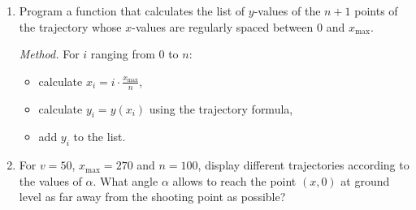\documentclass[11pt,class=report,crop=false]{standalone}
\begin{document}
\begin{activite}[Ballistics]
\begin{enumerate}
  \item Program a  function that calculates the list of $y$-values of the $n+1$ points of the trajectory whose $x$-values are regularly spaced between $0$ and $x_{\max}$. 
  
  \emph{Method.} For $i$ ranging from $0$ to $n$:
  \begin{itemize}
    \item calculate $x_i = i \cdot \frac{x_{\max}}{n}$,    
    \item calculate $y_i = y(x_i)$ using the trajectory formula,
    \item add $y_i$ to the list.
  \end{itemize}  
  
  
  \item For $v=50$, $x_{\max} = 270$ and $n=100$, display different trajectories according to the values of $\alpha$. What angle $\alpha$ allows to reach the point $(x,0)$ at ground level as far away from the shooting point as possible?
  
  
\end{enumerate}

\end{activite}
\end{document}
